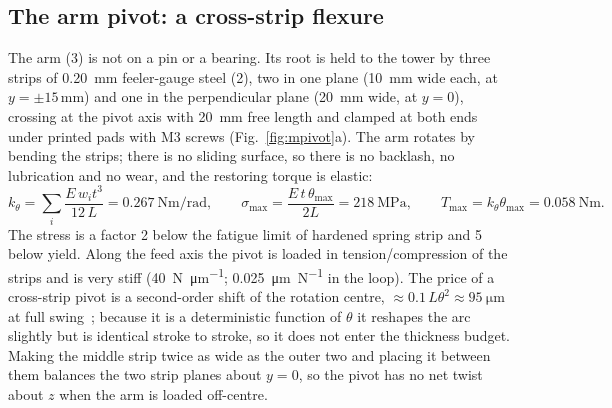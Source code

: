 \FloatBarrier
\subsection{The arm pivot: a cross-strip flexure}
The arm (3) is not on a pin or a bearing. Its root is held to the tower by three strips of \SI{0.20}{\milli\metre} feeler-gauge steel (2), two in one plane (10~mm wide each, at $y=\pm15$\,mm) and one in the perpendicular plane (20~mm wide, at $y=0$), crossing at the pivot axis with \SI{20}{\milli\metre} free length and clamped at both ends under printed pads with M3 screws (Fig.~\ref{fig:mpivot}a). The arm rotates by bending the strips; there is no sliding surface, so there is no backlash, no lubrication and no wear, and the restoring torque is elastic:
\begin{equation}
k_\theta=\sum_i\frac{E\,w_i t^3}{12\,L}=\SI{0.267}{\newton\metre\per\radian},\qquad
\sigma_{\max}=\frac{E\,t\,\theta_{\max}}{2L}=\SI{218}{\mega\pascal},\qquad
T_{\max}=k_\theta\theta_{\max}=\SI{0.058}{\newton\metre}.
\end{equation}
The stress is a factor 2 below the fatigue limit of hardened spring strip and 5 below yield. Along the feed axis the pivot is loaded in tension/compression of the strips and is very stiff (\SI{40}{\newton\per\micro\metre}; \SI{0.025}{\micro\metre\per\newton} in the loop). The price of a cross-strip pivot is a second-order shift of the rotation centre, $\approx0.1\,L\theta^2\approx\SI{95}{\micro\metre}$ at full swing~\citep{Wittrick1948,Haringx1949,SmithChetwynd2017}; because it is a deterministic function of $\theta$ it reshapes the arc slightly but is identical stroke to stroke, so it does not enter the thickness budget. Making the middle strip twice as wide as the outer two and placing it between them balances the two strip planes about $y=0$, so the pivot has no net twist about $z$ when the arm is loaded off-centre.

\FloatBarrier
